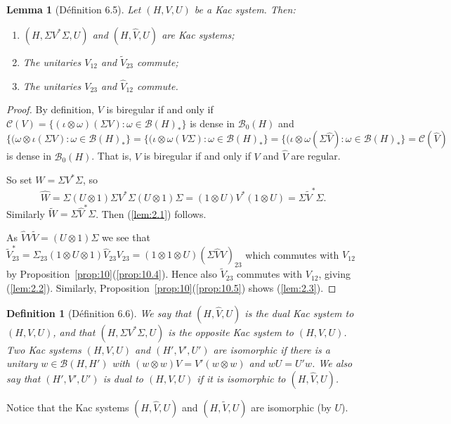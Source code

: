 \documentclass[a4paper,12pt]{article}
\theoremstyle{plain}
\newtheorem{lemma}[proposition]{Lemma}
\newtheorem{definition}[proposition]{Definition}
\theoremstyle{definition}
\newcommand{\mc}{\mathcal}
\begin{document}
\begin{lemma}[D\'efinition 6.5]\label{lem:2}
Let $(H,V,U)$ be a Kac system.  Then:
\begin{enumerate}
\item\label{lem:2.1} $(H,\Sigma V^* \Sigma,U)$ and $(H,\hat V,U)$
   are Kac systems;
\item\label{lem:2.2} The unitaries $V_{12}$ and $\tilde V_{23}$ commute;
\item\label{lem:2.3} The unitaries $V_{23}$ and $\hat V_{12}$ commute.
\end{enumerate}
\end{lemma}
\begin{proof}
By definition, $V$ is biregular if and only if $\mc C(V) =
\{(\iota\otimes\omega)(\Sigma V) : \omega\in\mc B(H)_*\}$ is dense in
$\mc B_0(H)$ and $\{(\omega\otimes\iota(\Sigma V) : \omega\in\mc B(H)_*\}
= \{(\iota\otimes\omega(V\Sigma) : \omega\in\mc B(H)_*\}
= \{(\iota\otimes\omega(\Sigma\hat V) : \omega\in\mc B(H)_*\}
= \mc C(\hat V)$ is dense in $\mc B_0(H)$.  That is, $V$ is biregular
if and only if $V$ and $\hat V$ are regular.

So set $W=\Sigma V^*\Sigma$, so
\[ \hat W = \Sigma(U\otimes 1)\Sigma V^*\Sigma(U\otimes 1)\Sigma
= (1\otimes U) V^* (1\otimes U) = \Sigma \tilde V^* \Sigma. \]
Similarly $\tilde W = \Sigma \hat V^* \Sigma$.  Then (\ref{lem:2.1}) follows.

As $\hat V V \tilde V = (U\otimes 1)\Sigma$ we see that
$\tilde V^*_{23} = \Sigma_{23}(1\otimes U\otimes 1)\hat V_{23} V_{23}
= (1\otimes 1\otimes U)(\Sigma \hat V V)_{23}$ which commutes with $V_{12}$
by Proposition~\ref{prop:10}(\ref{prop:10.4}).  Hence also $\tilde V_{23}$
commutes with $V_{12}$, giving (\ref{lem:2.2}).  Similarly,
Proposition~\ref{prop:10}(\ref{prop:10.5}) shows (\ref{lem:2.3}).
\end{proof}

\begin{definition}[D\'efinition 6.6]
We say that $(H,\hat V,U)$ is the \emph{dual Kac system} to $(H,V,U)$, and that
$(H,\Sigma V^*\Sigma,U)$ is the \emph{opposite Kac system} to $(H,V,U)$.
Two Kac systems $(H,V,U)$ and $(H',V',U')$ are \emph{isomorphic} if there is a
unitary $w\in\mc B(H,H')$ with $(w\otimes w)V=V'(w\otimes w)$ and $wU=U'w$.
We also say that $(H',V',U')$ is \emph{dual to} $(H,V,U)$ if it is isomorphic
to $(H,\hat V,U)$.
\end{definition}

Notice that the Kac systems $(H,\hat V,U)$ and $(H,\tilde V,U)$ are isomorphic
(by $U$).
\end{document}

